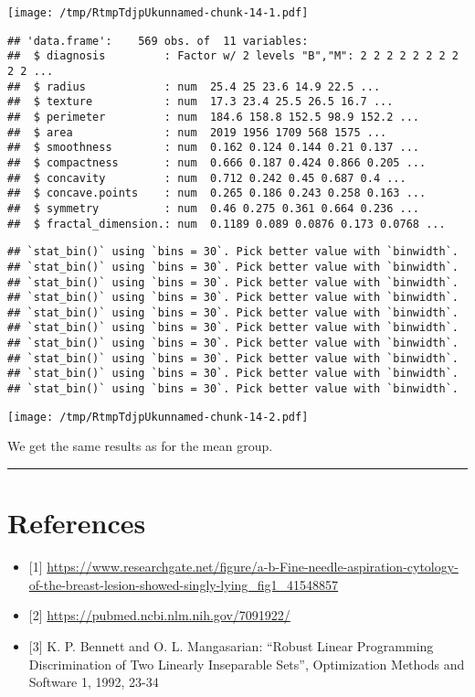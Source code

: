 \documentclass[
  11pt,
]{article}
\providecommand{\tightlist}{%
  \setlength{\itemsep}{0pt}\setlength{\parskip}{0pt}}
\begin{document}
\texttt{[image: /tmp/RtmpTdjpUkunnamed-chunk-14-1.pdf]}

\begin{verbatim}
## 'data.frame':    569 obs. of  11 variables:
##  $ diagnosis         : Factor w/ 2 levels "B","M": 2 2 2 2 2 2 2 2 2 2 ...
##  $ radius            : num  25.4 25 23.6 14.9 22.5 ...
##  $ texture           : num  17.3 23.4 25.5 26.5 16.7 ...
##  $ perimeter         : num  184.6 158.8 152.5 98.9 152.2 ...
##  $ area              : num  2019 1956 1709 568 1575 ...
##  $ smoothness        : num  0.162 0.124 0.144 0.21 0.137 ...
##  $ compactness       : num  0.666 0.187 0.424 0.866 0.205 ...
##  $ concavity         : num  0.712 0.242 0.45 0.687 0.4 ...
##  $ concave.points    : num  0.265 0.186 0.243 0.258 0.163 ...
##  $ symmetry          : num  0.46 0.275 0.361 0.664 0.236 ...
##  $ fractal_dimension.: num  0.1189 0.089 0.0876 0.173 0.0768 ...
\end{verbatim}

\begin{verbatim}
## `stat_bin()` using `bins = 30`. Pick better value with `binwidth`.
## `stat_bin()` using `bins = 30`. Pick better value with `binwidth`.
## `stat_bin()` using `bins = 30`. Pick better value with `binwidth`.
## `stat_bin()` using `bins = 30`. Pick better value with `binwidth`.
## `stat_bin()` using `bins = 30`. Pick better value with `binwidth`.
## `stat_bin()` using `bins = 30`. Pick better value with `binwidth`.
## `stat_bin()` using `bins = 30`. Pick better value with `binwidth`.
## `stat_bin()` using `bins = 30`. Pick better value with `binwidth`.
## `stat_bin()` using `bins = 30`. Pick better value with `binwidth`.
## `stat_bin()` using `bins = 30`. Pick better value with `binwidth`.
\end{verbatim}

\texttt{[image: /tmp/RtmpTdjpUkunnamed-chunk-14-2.pdf]}

We get the same results as for the mean group.

\begin{center}\rule{0.5\linewidth}{0.5pt}\end{center}

\hypertarget{references}{%
\section{References}\label{references}}

\begin{itemize}
\tightlist
\item
  {[}1{]}
  \url{https://www.researchgate.net/figure/a-b-Fine-needle-aspiration-cytology-of-the-breast-lesion-showed-singly-lying_fig1_41548857}
\item
  {[}2{]} \url{https://pubmed.ncbi.nlm.nih.gov/7091922/}
\item
  {[}3{]} K. P. Bennett and O. L. Mangasarian: ``Robust Linear
  Programming Discrimination of Two Linearly Inseparable Sets'',
  Optimization Methods and Software 1, 1992, 23-34
\end{itemize}
\end{document}

